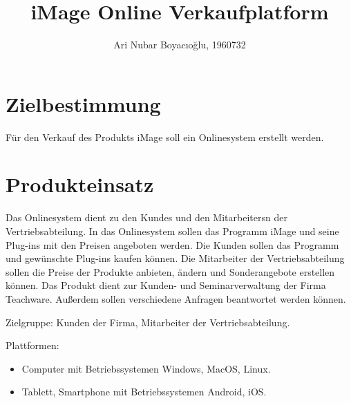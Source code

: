 \documentclass[parskip=full]{scrartcl}
\title{iMage Online Verkaufplatform}
\author{Ari Nubar Boyacıoğlu, 1960732}
\begin{document}
\maketitle

%
%
\section{Zielbestimmung}
Für den Verkauf des Produkts iMage soll ein Onlinesystem erstellt werden. 

\section{Produkteinsatz}

Das Onlinesystem dient zu den \glspl{Kunde} und den \glspl{Mitarbeiter}n der Vertriebsabteilung. In das Onlinesystem sollen das Programm iMage und seine Plug-ins mit den Preisen angeboten werden.
Die Kunden sollen das Programm und gewünschte Plug-ins kaufen können. Die Mitarbeiter der Vertriebsabteilung sollen die Preise der Produkte anbieten, ändern und Sonderangebote erstellen können.
Das Produkt dient zur Kunden- und Seminarverwaltung der Firma Teachware. Außerdem sollen verschiedene Anfragen beantwortet werden können.

Zielgruppe: Kunden der Firma, Mitarbeiter der Vertriebsabteilung.

Plattformen:	
\begin{itemize}[nosep]  
	\item \gls{Computer} mit Betriebssystemen Windows, MacOS, Linux.
	\item \gls{Tablett}, \gls{Smartphone} mit Betriebssystemen Android, iOS. 
\end{itemize} 
				
\newpage
\end{document}
